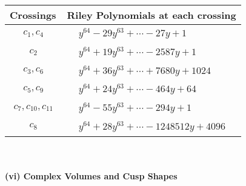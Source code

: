 \documentclass[1p]{elsarticle_modified}
\theoremstyle{definition}
\begin{document}
\begin{tabular}{m{50pt}|m{274pt}}
Crossings & \hspace{64pt}Riley Polynomials at each crossing \\
\hline $$\begin{aligned}c_{1},c_{4}\end{aligned}$$&$\begin{aligned}
&y^{64}-29 y^{63}+\cdots-27 y+1
\end{aligned}$\\
\hline $$\begin{aligned}c_{2}\end{aligned}$$&$\begin{aligned}
&y^{64}+19 y^{63}+\cdots-2587 y+1
\end{aligned}$\\
\hline $$\begin{aligned}c_{3},c_{6}\end{aligned}$$&$\begin{aligned}
&y^{64}+36 y^{63}+\cdots+7680 y+1024
\end{aligned}$\\
\hline $$\begin{aligned}c_{5},c_{9}\end{aligned}$$&$\begin{aligned}
&y^{64}+24 y^{63}+\cdots-464 y+64
\end{aligned}$\\
\hline $$\begin{aligned}c_{7},c_{10},c_{11}\end{aligned}$$&$\begin{aligned}
&y^{64}-55 y^{63}+\cdots-294 y+1
\end{aligned}$\\
\hline $$\begin{aligned}c_{8}\end{aligned}$$&$\begin{aligned}
&y^{64}+28 y^{63}+\cdots-1248512 y+4096
\end{aligned}$\\
\hline
\end{tabular}\\~\\
\newpage\flushleft \textbf{(vi) Complex Volumes and Cusp Shapes}
\end{document}
